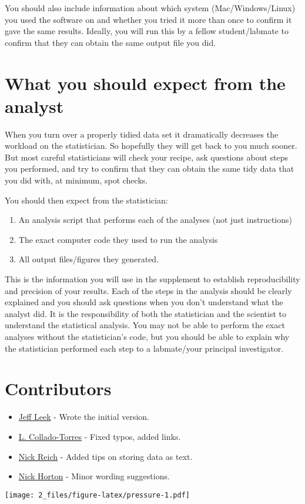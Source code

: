 \documentclass[
]{article}
\providecommand{\tightlist}{%
  \setlength{\itemsep}{0pt}\setlength{\parskip}{0pt}}
\begin{document}
You should also include information about which system
(Mac/Windows/Linux) you used the software on and whether you tried it
more than once to confirm it gave the same results. Ideally, you will
run this by a fellow student/labmate to confirm that they can obtain the
same output file you did.

\hypertarget{what-you-should-expect-from-the-analyst}{%
\section{What you should expect from the
analyst}\label{what-you-should-expect-from-the-analyst}}

When you turn over a properly tidied data set it dramatically decreases
the workload on the statistician. So hopefully they will get back to you
much sooner. But most careful statisticians will check your recipe, ask
questions about steps you performed, and try to confirm that they can
obtain the same tidy data that you did with, at minimum, spot checks.

You should then expect from the statistician:

\begin{enumerate}
\def\labelenumi{\arabic{enumi}.}
\tightlist
\item
  An analysis script that performs each of the analyses (not just
  instructions)
\item
  The exact computer code they used to run the analysis
\item
  All output files/figures they generated.
\end{enumerate}

This is the information you will use in the supplement to establish
reproducibility and precision of your results. Each of the steps in the
analysis should be clearly explained and you should ask questions when
you don't understand what the analyst did. It is the responsibility of
both the statistician and the scientist to understand the statistical
analysis. You may not be able to perform the exact analyses without the
statistician's code, but you should be able to explain why the
statistician performed each step to a labmate/your principal
investigator.

\hypertarget{contributors}{%
\section{Contributors}\label{contributors}}

\begin{itemize}
\tightlist
\item
  \href{http://biostat.jhsph.edu/~jleek/}{Jeff Leek} - Wrote the initial
  version.
\item
  \href{http://bit.ly/LColladoTorres}{L. Collado-Torres} - Fixed typos,
  added links.
\item
  \href{http://people.umass.edu/nick/}{Nick Reich} - Added tips on
  storing data as text.
\item
  \href{https://www.amherst.edu/people/facstaff/nhorton}{Nick Horton} -
  Minor wording suggestions.
\end{itemize}

\texttt{[image: 2\_files/figure-latex/pressure-1.pdf]}
\end{document}
